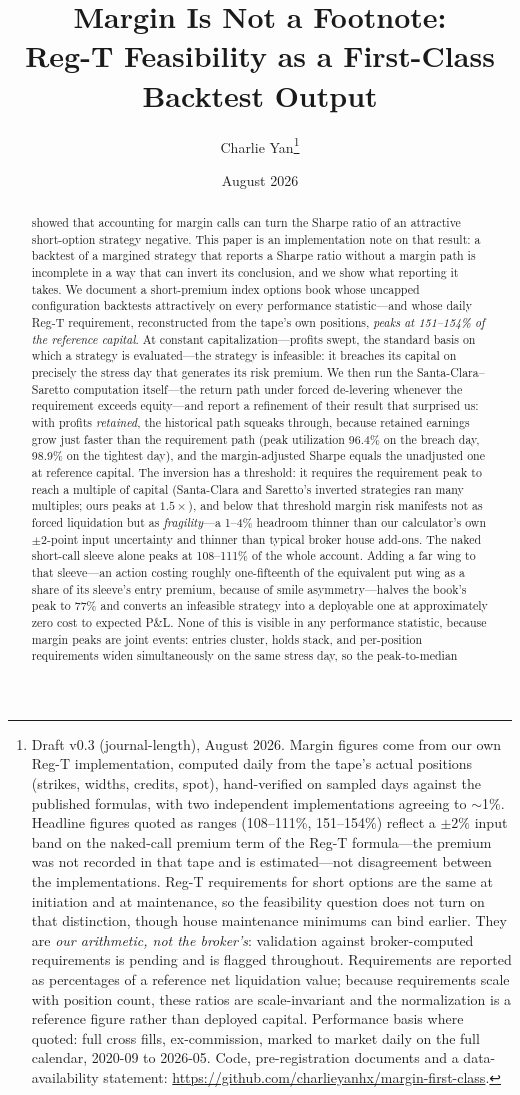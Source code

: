 \documentclass[11pt]{article}
\title{\textbf{Margin Is Not a Footnote:\\ Reg-T Feasibility as a First-Class Backtest Output}}
\author{Charlie Yan\thanks{Draft v0.3 (journal-length), August 2026. Margin figures come from
our own Reg-T implementation, computed daily from the tape's actual positions (strikes, widths,
credits, spot), hand-verified on sampled days against the published formulas, with two
independent implementations agreeing to $\sim$1\%. Headline figures quoted as ranges
(108--111\%, 151--154\%) reflect a $\pm 2\%$ input band on the naked-call premium term of the
Reg-T formula---the premium was not recorded in that tape and is estimated---not disagreement
between the implementations. Reg-T requirements for short options are the same at initiation
and at maintenance, so the feasibility question does not turn on that distinction, though house
maintenance minimums can bind earlier. They are \emph{our arithmetic, not the
broker's}: validation against broker-computed requirements is pending and is flagged throughout.
Requirements are reported as percentages of a reference net liquidation value; because
requirements scale with position count, these ratios are scale-invariant and the normalization
is a reference figure rather than deployed capital. Performance basis where quoted: full cross
fills, ex-commission, marked to market daily on the full calendar, 2020-09 to 2026-05.
Code, pre-registration documents and a data-availability statement: \url{https://github.com/charlieyanhx/margin-first-class}.}}
\date{August 2026}
\begin{document}
\maketitle

\begin{abstract}
\citet{ss} showed that accounting for margin calls can turn the Sharpe ratio of an attractive
short-option strategy negative. This paper is an implementation note on that result: a backtest of
a margined strategy that reports a Sharpe ratio without a margin path is incomplete in a way that
can invert its conclusion, and we show what reporting it takes. We document a short-premium index options
book whose uncapped configuration backtests attractively on every performance statistic---and
whose daily Reg-T requirement, reconstructed from the tape's own positions, \emph{peaks at
151--154\% of the reference capital}. At constant capitalization---profits swept, the standard
basis on which a strategy is evaluated---the strategy is infeasible: it breaches its capital on
precisely the stress day that generates its risk premium. We then run the Santa-Clara--Saretto
computation itself---the return path under forced de-levering whenever the requirement exceeds
equity---and report a refinement of their result that surprised us: with profits \emph{retained},
the historical path squeaks through, because retained earnings grow just faster than the
requirement path (peak utilization 96.4\% on the breach day, 98.9\% on the tightest day), and
the margin-adjusted Sharpe equals the unadjusted one at reference capital. The inversion has a
threshold: it requires the requirement peak to reach a multiple of capital (Santa-Clara and
Saretto's inverted strategies ran many multiples; ours peaks at $1.5\times$), and below that
threshold margin risk manifests not as forced liquidation but as \emph{fragility}---a 1--4\%
headroom thinner than our calculator's own $\pm 2$-point input uncertainty and thinner than
typical broker house add-ons. The naked short-call
sleeve alone peaks at 108--111\% of the whole account. Adding a far wing to that sleeve---an
action costing roughly one-fifteenth of the equivalent put wing as a share of its sleeve's
entry premium, because of smile
asymmetry---halves the book's peak to 77\% and converts an infeasible strategy into a
deployable one at approximately zero cost to expected P\&L. None of this is visible in any
performance statistic, because margin peaks are joint events: entries cluster, holds stack, and
per-position requirements widen simultaneously on the same stress day, so the peak-to-median

\end{abstract}
\end{document}
